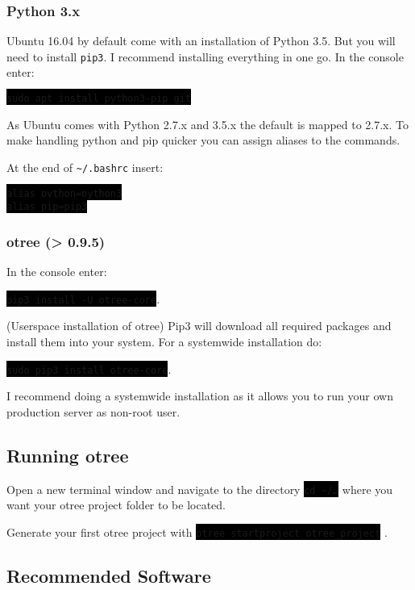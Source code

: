 \documentclass[11pt]{article}
\newcommand{\lincode}[1]{\colorbox{black}{\footnotesize\color{green}\tt #1}}
\begin{document}
\subsubsection{Python 3.x}
\label{sec:orgheadline21}

Ubuntu 16.04 by default come with an installation of Python 3.5. But you will need to install \texttt{pip3}.
I recommend installing everything in one go. 
In the console enter:

\lincode{sudo apt install python3-pip git}

As Ubuntu comes with Python 2.7.x and 3.5.x the default is mapped to 2.7.x. To make handling python and pip quicker you can assign aliases to the commands.

At the end of \texttt{\textasciitilde/.bashrc} insert:

\lincode{alias python=python3}\\
\lincode{alias pip=pip3}

\subsubsection{otree (> 0.9.5)}
\label{sec:orgheadline22}

In the console enter: 

\lincode{pip3 install -U otree-core}. 

(Userspace installation of otree) Pip3 will download all required packages and install them into your system.
For a systemwide installation do:

\lincode{sudo pip3 install otree-core}. 

I recommend doing a systemwide installation as it allows you to run your own production server as non-root user.

\subsection{Running otree}
\label{sec:orgheadline24}

Open a new terminal window and navigate to the directory \lincode{cd \textasciitilde/\ldots} where you want your otree project folder to be located.

Generate your first otree project with \lincode{otree startproject otree\_project} .

\subsection{Recommended Software}
\label{sec:orgheadline27}
\end{document}

